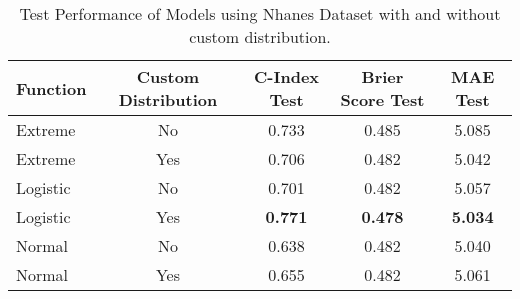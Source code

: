 \begin{table}[h!]
\centering
\caption{Test Performance of Models using Nhanes Dataset with and without custom distribution.}
\label{tab:test_performance_nhanes_1}
\begin{tabular}{l|c|c|c|c}
\hline
\textbf{Function} & \textbf{Custom Distribution} & \textbf{C-Index Test} & \textbf{Brier Score Test} & \textbf{MAE Test} \\
\hline
Extreme & No & 0.733 & 0.485 & 5.085 \\
Extreme & Yes & 0.706 & 0.482 & 5.042 \\
Logistic & No & 0.701 & 0.482 & 5.057 \\
Logistic & Yes & \textbf{0.771} & \textbf{0.478} & \textbf{5.034} \\
Normal & No & 0.638 & 0.482 & 5.040 \\
Normal & Yes & 0.655 & 0.482 & 5.061 \\
\hline
\end{tabular}
\end{table}
